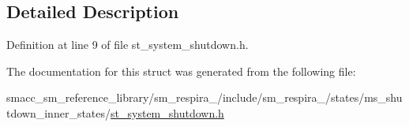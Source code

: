 \subsection{Detailed Description}


Definition at line 9 of file st\+\_\+system\+\_\+shutdown.\+h.



The documentation for this struct was generated from the following file\+:\begin{DoxyCompactItemize}
\item 
smacc\+\_\+sm\+\_\+reference\+\_\+library/sm\+\_\+respira\+\_/include/sm\+\_\+respira\+\_/states/ms\+\_\+shutdown\+\_\+inner\+\_\+states/\hyperlink{st__system__shutdown_8h}{st\+\_\+system\+\_\+shutdown.\+h}\end{DoxyCompactItemize}
